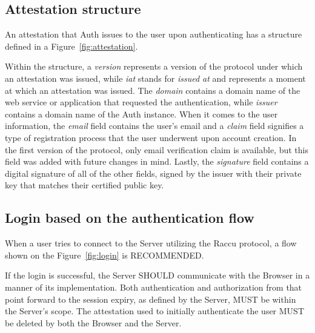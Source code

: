    \subsection{Attestation structure}
    An attestation that Auth issues to the user upon authenticating has a structure defined in a Figure~\ref{fig:attestation}.
    
    Within the structure, a \textit{version} represents a version of the protocol under which an attestation was issued, 
    while \textit{iat} stands for \textit{issued at} and represents a moment at which an attestation was issued. The 
    \textit{domain} contains a domain name of the web service or application that requested the authentication, while 
    \textit{issuer} contains a domain name of the Auth instance. When it comes to the user information, the \textit{email}
    field contains the user's email and a \textit{claim} field signifies a type of registration process that the user 
    underwent upon account creation. In the first version of the protocol, only email verification claim is available, but 
    this field was added with future changes in mind. Lastly, the \textit{signature} field contains a digital signature of 
    all of the other fields, signed by the issuer with their private key that matches their certified public key. 

    \subsection{Login based on the authentication flow}
    When a user tries to connect to the Server utilizing the Raccu protocol, a flow shown on the Figure~\ref{fig:login} 
    is RECOMMENDED.
    
    If the login is successful, the Server SHOULD communicate with the Browser in a manner of its implementation. Both 
    authentication and authorization from that point forward to the session expiry, as defined by the Server, MUST be 
    within the Server's scope. The attestation used to initially authenticate the user MUST be deleted by both the Browser
    and the Server.       
